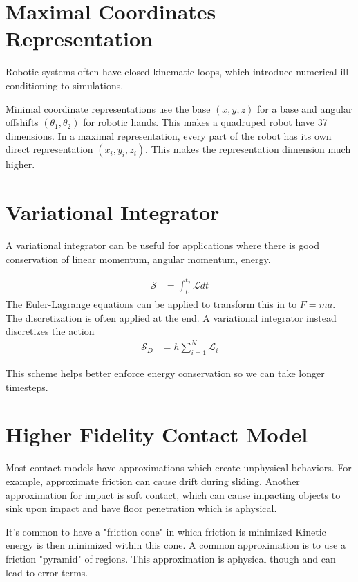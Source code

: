 \documentclass[book.tex]{subfiles}
\begin{document}

\section{Maximal Coordinates Representation}
Robotic systems often have closed kinematic loops, which introduce numerical ill-conditioning to simulations.

Minimal coordinate representations use the base $(x,y,z)$ for a base and angular offshifts $(\theta_1, \theta_2)$ for robotic hands. This makes a quadruped robot have 37 dimensions. In a maximal representation, every part of the robot has its own direct representation $(x_i, y_i, z_i)$. This makes the representation dimension much higher.

\section{Variational Integrator}

A variational integrator can be useful for applications where there is good conservation of linear momentum, angular momentum, energy.

\begin{align}
    \mathcal{S} &= \int_{t_1}^{t_2} \mathcal{L} dt
\end{align}
The Euler-Lagrange equations can be applied to transform this in to $F=ma$. The discretization is often applied at the end. A variational integrator instead discretizes the action
\begin{align}
    \mathcal{S}_D &= h \sum_{i=1}^N \mathcal{L}_i
\end{align}

This scheme helps better enforce energy conservation so we can take longer timesteps.

\section{Higher Fidelity Contact Model}

Most contact models have approximations which create unphysical behaviors. For example, approximate friction can cause drift during sliding. Another approximation for impact is soft contact, which can cause impacting objects to sink upon impact and have floor penetration which is aphysical.

It's common to have a "friction cone" in which friction is minimized %
Kinetic energy is then minimized within this cone. A common approximation is to use a friction "pyramid" of regions. This approximation is aphysical though and can lead to error terms.
\end{document}
